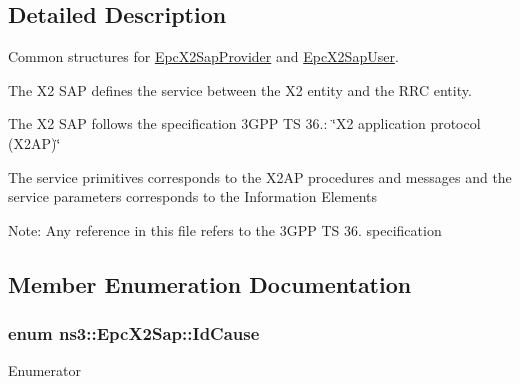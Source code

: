 \subsection{Detailed Description}
Common structures for \hyperlink{classns3_1_1EpcX2SapProvider}{Epc\+X2\+Sap\+Provider} and \hyperlink{classns3_1_1EpcX2SapUser}{Epc\+X2\+Sap\+User}. 

The X2 S\+AP defines the service between the X2 entity and the R\+RC entity.

The X2 S\+AP follows the specification 3\+G\+PP TS 36.\+: \char`\"{}\+X2 application protocol (\+X2\+A\+P)\char`\"{}

The service primitives corresponds to the X2\+AP procedures and messages and the service parameters corresponds to the Information Elements

Note\+: Any reference in this file refers to the 3\+G\+PP TS 36. specification 

\subsection{Member Enumeration Documentation}
\subsubsection[{\texorpdfstring{Id\+Cause}{IdCause}}]{\setlength{\rightskip}{0pt plus 5cm}enum {\bf ns3\+::\+Epc\+X2\+Sap\+::\+Id\+Cause}}\hypertarget{classns3_1_1EpcX2Sap_aecbbca5ab8e21ca831d8ad02dada6d85}{}\label{classns3_1_1EpcX2Sap_aecbbca5ab8e21ca831d8ad02dada6d85}
\begin{Desc}
\item[Enumerator]\par
\begin{description}
\item[{\em 
Handover\+Desirable\+For\+Radio\+Reason\hypertarget{classns3_1_1EpcX2Sap_aecbbca5ab8e21ca831d8ad02dada6d85a967926119f5907b728250f8f7abe9a2e}{}\label{classns3_1_1EpcX2Sap_aecbbca5ab8e21ca831d8ad02dada6d85a967926119f5907b728250f8f7abe9a2e}
}]\item[{\em 
Time\+Critical\+Handover\hypertarget{classns3_1_1EpcX2Sap_aecbbca5ab8e21ca831d8ad02dada6d85a8ef37e9e61e7776cf68421d2c5b96b5b}{}\label{classns3_1_1EpcX2Sap_aecbbca5ab8e21ca831d8ad02dada6d85a8ef37e9e61e7776cf68421d2c5b96b5b}
}]\end{description}
\end{Desc}

